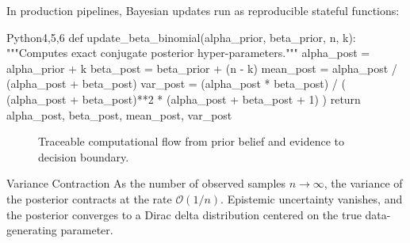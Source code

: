 In production pipelines, Bayesian updates run as reproducible stateful functions:

\begin{HighlightedCodeBlock}[numbers=left]{Python}{4,5,6}
def update_beta_binomial(alpha_prior, beta_prior, n, k):
    """Computes exact conjugate posterior hyper-parameters."""
    alpha_post = alpha_prior + k
    beta_post = beta_prior + (n - k)
    mean_post = alpha_post / (alpha_post + beta_post)
    var_post = (alpha_post * beta_post) / (
        (alpha_post + beta_post)**2 * (alpha_post + beta_post + 1)
    )
    return alpha_post, beta_post, mean_post, var_post
\end{HighlightedCodeBlock}

\begin{figure}[htbp]
  \centering
  \caption{Traceable computational flow from prior belief and evidence to decision boundary.}
\end{figure}

\begin{SummaryBox}{Variance Contraction}
  As the number of observed samples \(n \to \infty\), the variance of the posterior contracts at the rate \(\mathcal{O}(1/n)\). Epistemic uncertainty vanishes, and the posterior converges to a Dirac delta distribution centered on the true data-generating parameter.
\end{SummaryBox}

